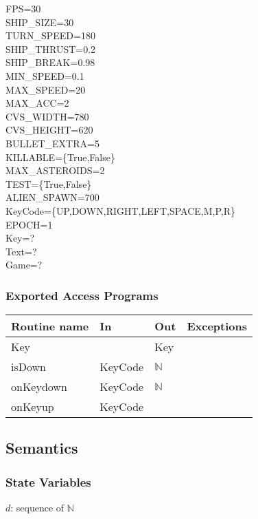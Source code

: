 \documentclass[12pt]{article}
\begin{document}
FPS=30\\
SHIP_SIZE=30\\
TURN_SPEED=180\\
SHIP_THRUST=0.2\\
SHIP_BREAK=0.98\\
MIN_SPEED=0.1\\
MAX_SPEED=20\\
MAX_ACC=2\\
CVS_WIDTH=780\\
CVS_HEIGHT=620\\
BULLET_EXTRA=5\\
KILLABLE=\{True,False\}\\
MAX_ASTEROIDS=2\\
TEST=\{True,False\}\\
ALIEN_SPAWN=700\\
KeyCode=\{UP,DOWN,RIGHT,LEFT,SPACE,M,P,R\}\\
EPOCH=1\\
Key=?\\
Text=?\\
Game=?\\

\subsubsection*{Exported Access Programs}

\begin{tabular}{| l | l | l | l |} %
\hline
\textbf{Routine name} & \textbf{In} & \textbf{Out} & \textbf{Exceptions}\\
\hline
Key &  & Key & ~\\
\hline
isDown & KeyCode & $\mathbb{N}$ & ~\\
\hline
onKeydown & KeyCode & $\mathbb{N}$ & ~\\
\hline
onKeyup & KeyCode &  & ~\\
\hline
\end{tabular}

\subsection*{Semantics}

\subsubsection*{State Variables}

$d$: sequence of $\mathbb{N}$\\
\end{document}
